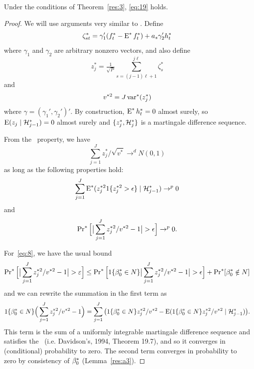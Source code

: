 \documentclass[12pt,fleqn]{article}
\begin{document}
\begin{lema}\label{lem-clt}
  Under the conditions of Theorem~\ref{res:3}, \eqref{eq:19} holds.
\end{lema}
\begin{proof}

  We will use arguments very similar to \cite{Cal:14}. Define
  \[
  \zeta_{st}^* = \gamma_1'(f_t^* - \operatorname{E}^* f_t^*) + a_s \gamma_2' h_t^*
  \]
  where $\gamma_1$ and $\gamma_2$ are arbitrary nonzero vectors, and
  also define
  \[
  z_j^* = \tfrac{1}{\sqrt{P}} \sum_{s=(j-1) \ell + 1}^{j\ell} \zeta_s^*
  \]
  and
  \[
  v^{*2} = J \operatorname{var}^*(z_j^*)
  \]
  where $\gamma = (\gamma_1', \gamma_2')'$. By construction, $\operatorname{E}^*
  h_t^* = 0$ almost surely, so $\operatorname{E}(z_j \mid \mathcal{H}_{j-1}^*) = 0$ almost
  surely and $\{z_j^*, \mathcal{H}_j^*\}$ is a martingale difference sequence.

  From the \mds\ property, we have
  \begin{equation*}
    \sum_{j=1}^J z_j^* / \sqrt{v^*} \to^d N(0, 1)
  \end{equation*}
  as long as the following properties hold:
  \begin{equation}\label{eq:7}
    \sum_{j=1}^J \operatorname{E}^*(z_j^{*2} 1\{z_j^{*2} > \epsilon\} \mid \mathcal{H}_{j-1}^*) \to^p 0
  \end{equation}
  and
  \begin{equation}\label{eq:8}
    \operatorname{Pr}^*\Big[ \big| \sum_{j=1}^J z_j^{*2}/v^{*2} - 1 \big| > \epsilon\Big] \to^p 0.
  \end{equation}

  For~\eqref{eq:8}, we have the usual bound
  \begin{equation*}
    \operatorname{Pr}^*\Big[ \big|\sum_{j=1}^J z_j^{*2}/v^{*2} - 1 \big| > \varepsilon\Big] \leq
    \operatorname{Pr}^*\Big[ 1\{\beta_0^* \in N\} \big| \sum_{j=1}^J z_j^{*2}/v^{*2} - 1 \big| > \epsilon \Big]
     + \operatorname{Pr}^*[ \beta_0^* \notin N ]
  \end{equation*}
  and we can rewrite the summation in the first term as
  \begin{equation*}
    1\{\beta_0^* \in N\} \Big( \sum_{j=1}^J z_j^{*2}/v^{*2} - 1 \Big)
    =  \sum_{j=1}^J \big(1\{\beta_0^* \in N\}z_j^{*2}/v^{*2} -
    \operatorname{E}(1\{\beta_0^* \in N\}z_j^{*2}/v^{*2} \mid \mathcal{H}_{j-1}^*) \big).
   \end{equation*}
   This term is the sum of a uniformly integrable martingale
   difference sequence and satisfies the \lln\ (i.e. Davidson's, 1994,
   Theorem 19.7), and so it converges in (conditional) probability to
   zero.  The second term converges in probability to zero by
   consistency of $\beta_0^*$ (Lemma~\ref{res:a3}).


\end{proof}
\end{document}

